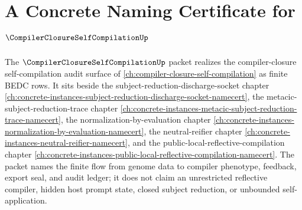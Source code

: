 \chapter{A Concrete Naming Certificate for $\CompilerClosureSelfCompilationUp$}
\label{ch:concrete-instances-compiler-closure-self-compilation-namecert}

The $\CompilerClosureSelfCompilationUp$ packet realizes the compiler-closure self-compilation audit surface of \autoref{ch:compiler-closure-self-compilation} as finite BEDC rows. It sits beside the subject-reduction-discharge-socket chapter \autoref{ch:concrete-instances-subject-reduction-discharge-socket-namecert}, the metacic-subject-reduction-trace chapter \autoref{ch:concrete-instances-metacic-subject-reduction-trace-namecert}, the normalization-by-evaluation chapter \autoref{ch:concrete-instances-normalization-by-evaluation-namecert}, the neutral-reifier chapter \autoref{ch:concrete-instances-neutral-reifier-namecert}, and the public-local-reflective-compilation chapter \autoref{ch:concrete-instances-public-local-reflective-compilation-namecert}. The packet names the finite flow from genome data to compiler phenotype, feedback, export seal, and audit ledger; it does not claim an unrestricted reflective compiler, hidden host prompt state, closed subject reduction, or unbounded self-application.

